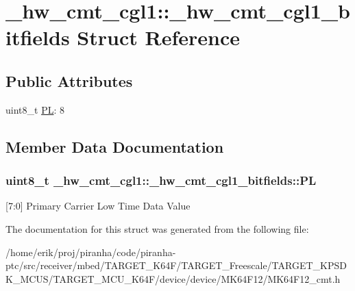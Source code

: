 \hypertarget{struct__hw__cmt__cgl1_1_1__hw__cmt__cgl1__bitfields}{}\section{\+\_\+hw\+\_\+cmt\+\_\+cgl1\+:\+:\+\_\+hw\+\_\+cmt\+\_\+cgl1\+\_\+bitfields Struct Reference}
\label{struct__hw__cmt__cgl1_1_1__hw__cmt__cgl1__bitfields}
\subsection*{Public Attributes}
\begin{DoxyCompactItemize}
\item 
uint8\+\_\+t \hyperlink{struct__hw__cmt__cgl1_1_1__hw__cmt__cgl1__bitfields_ab2c15530450b6370cd89f0a4988a7c60}{PL}\+: 8
\end{DoxyCompactItemize}


\subsection{Member Data Documentation}
\subsubsection[{\texorpdfstring{PL}{PL}}]{\setlength{\rightskip}{0pt plus 5cm}uint8\+\_\+t \+\_\+hw\+\_\+cmt\+\_\+cgl1\+::\+\_\+hw\+\_\+cmt\+\_\+cgl1\+\_\+bitfields\+::\+PL}\hypertarget{struct__hw__cmt__cgl1_1_1__hw__cmt__cgl1__bitfields_ab2c15530450b6370cd89f0a4988a7c60}{}\label{struct__hw__cmt__cgl1_1_1__hw__cmt__cgl1__bitfields_ab2c15530450b6370cd89f0a4988a7c60}
\mbox{[}7\+:0\mbox{]} Primary Carrier Low Time Data Value 

The documentation for this struct was generated from the following file\+:\begin{DoxyCompactItemize}
\item 
/home/erik/proj/piranha/code/piranha-\/ptc/src/receiver/mbed/\+T\+A\+R\+G\+E\+T\+\_\+\+K64\+F/\+T\+A\+R\+G\+E\+T\+\_\+\+Freescale/\+T\+A\+R\+G\+E\+T\+\_\+\+K\+P\+S\+D\+K\+\_\+\+M\+C\+U\+S/\+T\+A\+R\+G\+E\+T\+\_\+\+M\+C\+U\+\_\+\+K64\+F/device/device/\+M\+K64\+F12/M\+K64\+F12\+\_\+cmt.\+h\end{DoxyCompactItemize}
